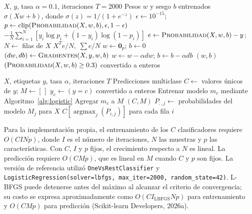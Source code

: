 \documentclass[10pt,letterpaper,twocolumn]{article}
\begin{document}
\begin{algorithm}[H]
\caption{Regresión logística binaria propia}
\label{alg:logistic}
\begin{algorithmic}[1]
\Require $X$, $y$, tasa $\alpha=0.1$, iteraciones $T=2000$
\Ensure Pesos $w$ y sesgo $b$ entrenados
  \State \Return $\sigma(Xw+b)$, donde $\sigma(z)=1/(1+e^{-z})$
\EndFunction
{}
  \State $\epsilon\gets10^{-15}$; $p\gets\operatorname{clip}(\Call{Probabilidad}{X,w,b},\epsilon,1-\epsilon)$
  \State \Return $-\frac{1}{N}\sum_{i=1}^{N}[y_i\log p_i+(1-y_i)\log(1-p_i)]$
\EndFunction
{}
  \State $e\gets\Call{Probabilidad}{X,w,b}-y$; $N\gets$ filas de $X$
  \State \Return $X^Te/N,\;\sum e/N$
\EndFunction
{}
  \State $w\gets\mathbf{0}_{p}$; $b\gets0$
    \State $(dw,db)\gets\Call{Gradientes}{X,y,w,b}$
    \State $w\gets w-\alpha dw$; $b\gets b-\alpha db$
  \EndFor
  \State \Return $(w,b)$
\EndFunction
{}
  \State \Return $(\Call{Probabilidad}{X,w,b}\geq0.3)$ convertido a enteros
\EndFunction
\end{algorithmic}
\end{algorithm}

\begin{algorithm}[H]
\caption{Clasificación multiclase mediante OvR}
\label{alg:ovr}
\begin{algorithmic}[1]
\Require $X$, etiquetas $y$, tasa $\alpha$, iteraciones $T$
\Ensure Predicciones multiclase
  \State $C\gets$ valores únicos de $y$; $M\gets[\,]$
    \State $y_c\gets(y=c)$ convertido a enteros
    \State Entrenar modelo $m_c$ mediante Algoritmo~\ref{alg:logistic}
    \State Agregar $m_c$ a $M$
  \EndFor
  \State \Return $(C,M)$
\EndFunction
{}
    \State $P_{:,j}\gets$ probabilidades del modelo $M_j$ para $X$
  \EndFor
  \State \Return $C[\operatorname{argmax}_{j}(P_{i,j})]$ para cada fila $i$
\EndFunction
\end{algorithmic}
\end{algorithm}

Para la implementación propia, el entrenamiento de los $C$ clasificadores requiere $O(CINp)$, donde $I$ es el número de iteraciones, $N$ las muestras y $p$ las características. Con $C$, $I$ y $p$ fijos, el crecimiento respecto a $N$ es lineal. La predicción requiere $O(CMp)$, que es lineal en $M$ cuando $C$ y $p$ son fijos. La versión de referencia utilizó \texttt{OneVsRestClassifier} y \texttt{LogisticRegression(solver=lbfgs, max\_iter=2000, random\_state=42)}. L-BFGS puede detenerse antes del máximo al alcanzar el criterio de convergencia; su costo se expresa aproximadamente como $O(CI_{\mathrm{LBFGS}}Np)$ para entrenamiento y $O(CMp)$ para predicción (Scikit-learn Developers, 2026a).
\end{document}
